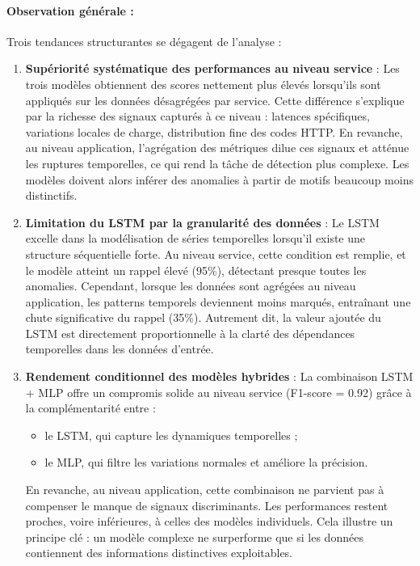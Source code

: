 \documentclass[a4paper,12pt]{report}
\begin{document}
\paragraph{Observation générale :}
Trois tendances structurantes se dégagent de l'analyse :
\begin{enumerate}
    \item \textbf{Supériorité systématique des performances au niveau service} :  
    Les trois modèles obtiennent des scores nettement plus élevés lorsqu'ils sont appliqués sur les données désagrégées par service. Cette différence s’explique par la richesse des signaux capturés à ce niveau : latences spécifiques, variations locales de charge, distribution fine des codes HTTP.  
    En revanche, au niveau application, l’agrégation des métriques dilue ces signaux et atténue les ruptures temporelles, ce qui rend la tâche de détection plus complexe. Les modèles doivent alors inférer des anomalies à partir de motifs beaucoup moins distinctifs.

    \item \textbf{Limitation du LSTM par la granularité des données} :  
    Le LSTM excelle dans la modélisation de séries temporelles lorsqu'il existe une structure séquentielle forte. Au niveau service, cette condition est remplie, et le modèle atteint un rappel élevé (95\%), détectant presque toutes les anomalies.  
    Cependant, lorsque les données sont agrégées au niveau application, les patterns temporels deviennent moins marqués, entraînant une chute significative du rappel (35\%). Autrement dit, la valeur ajoutée du LSTM est directement proportionnelle à la clarté des dépendances temporelles dans les données d’entrée.

    \item \textbf{Rendement conditionnel des modèles hybrides} :  
    La combinaison LSTM + MLP offre un compromis solide au niveau service (F1-score = 0.92) grâce à la complémentarité entre :
    \begin{itemize}
        \item le LSTM, qui capture les dynamiques temporelles ;
        \item le MLP, qui filtre les variations normales et améliore la précision.
    \end{itemize}
    En revanche, au niveau application, cette combinaison ne parvient pas à compenser le manque de signaux discriminants. Les performances restent proches, voire inférieures, à celles des modèles individuels. Cela illustre un principe clé : un modèle complexe ne surperforme que si les données contiennent des informations distinctives exploitables.
\end{enumerate}
\end{document}
